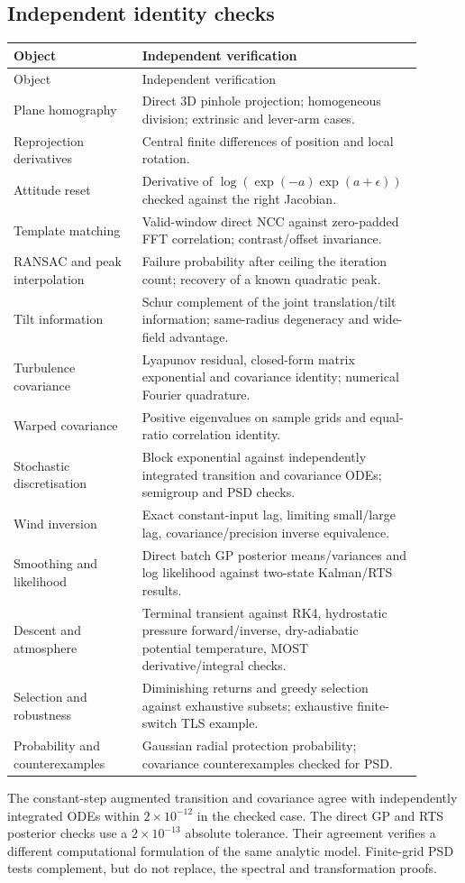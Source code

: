 \documentclass[11pt,a4paper]{article}
\numberwithin{equation}{section}
\begin{document}
\subsection{Independent identity checks}
\begin{longtable}{p{0.29\linewidth}p{0.61\linewidth}}
\toprule
Object & Independent verification\\
\midrule
\endfirsthead
\toprule Object & Independent verification\\\midrule\endhead
Plane homography & Direct 3D pinhole projection; homogeneous division; extrinsic and lever-arm cases.\\
Reprojection derivatives & Central finite differences of position and local rotation.\\
Attitude reset & Derivative of $\log(\exp(-a)\exp(a+\epsilon))$ checked against the right Jacobian.\\
Template matching & Valid-window direct NCC against zero-padded FFT correlation; contrast/offset invariance.\\
RANSAC and peak interpolation & Failure probability after ceiling the iteration count; recovery of a known quadratic peak.\\
Tilt information & Schur complement of the joint translation/tilt information; same-radius degeneracy and wide-field advantage.\\
Turbulence covariance & Lyapunov residual, closed-form matrix exponential and covariance identity; numerical Fourier quadrature.\\
Warped covariance & Positive eigenvalues on sample grids and equal-ratio correlation identity.\\
Stochastic discretisation & Block exponential against independently integrated transition and covariance ODEs; semigroup and PSD checks.\\
Wind inversion & Exact constant-input lag, limiting small/large lag, covariance/precision inverse equivalence.\\
Smoothing and likelihood & Direct batch GP posterior means/variances and log likelihood against two-state Kalman/RTS results.\\
Descent and atmosphere & Terminal transient against RK4, hydrostatic pressure forward/inverse, dry-adiabatic potential temperature, MOST derivative/integral checks.\\
Selection and robustness & Diminishing returns and greedy selection against exhaustive subsets; exhaustive finite-switch TLS example.\\
Probability and counterexamples & Gaussian radial protection probability; covariance counterexamples checked for PSD.\\
\bottomrule
\end{longtable}
The constant-step augmented transition and covariance agree with independently integrated ODEs within $2\times10^{-12}$ in the checked case. The direct GP and RTS posterior checks use a $2\times10^{-13}$ absolute tolerance. Their agreement verifies a different computational formulation of the same analytic model. Finite-grid PSD tests complement, but do not replace, the spectral and transformation proofs.
\end{document}
